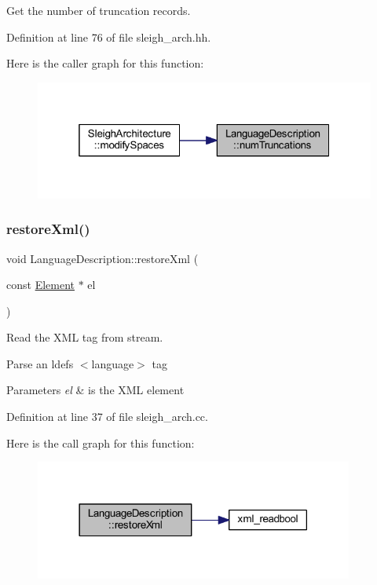 Get the number of truncation records. 



Definition at line 76 of file sleigh\+\_\+arch.\+hh.

Here is the caller graph for this function\+:
\nopagebreak
\begin{figure}[H]
\begin{center}
\leavevmode
\includegraphics[width=319pt]{class_language_description_ae8ebd52ceb6c7b018ba49aa6bc536a8b_icgraph}
\end{center}
\end{figure}
\mbox{\label{class_language_description_a4bbedcd8baa147052ac4e9a01952e96e}} 
\subsubsection{\texorpdfstring{restoreXml()}{restoreXml()}}
{\footnotesize\ttfamily void Language\+Description\+::restore\+Xml (\begin{DoxyParamCaption}\item[{const \mbox{\hyperlink{class_element}{Element}} $\ast$}]{el }\end{DoxyParamCaption})}



Read the X\+ML tag from stream. 

Parse an ldefs $<$language$>$ tag 
\begin{DoxyParams}{Parameters}
{\em el} & is the X\+ML element \\
\hline
\end{DoxyParams}


Definition at line 37 of file sleigh\+\_\+arch.\+cc.

Here is the call graph for this function\+:
\nopagebreak
\begin{figure}[H]
\begin{center}
\leavevmode
\includegraphics[width=297pt]{class_language_description_a4bbedcd8baa147052ac4e9a01952e96e_cgraph}
\end{center}
\end{figure}


